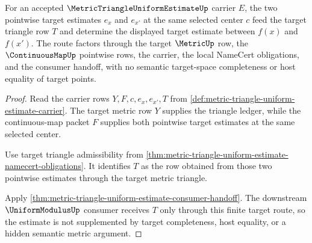 \begin{theorem}
\label{thm:metric-triangle-uniform-estimate-target-triangle-coherence}
For an accepted $\MetricTriangleUniformEstimateUp$ carrier $E$, the two pointwise target estimates $e_x$ and $e_{x'}$ at the same selected center $c$ feed the target triangle row $T$ and determine the displayed target estimate between $f(x)$ and $f(x')$. The route factors through the target $\MetricUp$ row, the $\ContinuousMapUp$ pointwise rows, the carrier, the local NameCert obligations, and the consumer handoff, with no semantic target-space completeness or host equality of target points.
\end{theorem}
\begin{proof}
Read the carrier rows $Y,F,c,e_x,e_{x'},T$ from \autoref{def:metric-triangle-uniform-estimate-carrier}. The target metric row $Y$ supplies the triangle ledger, while the continuous-map packet $F$ supplies both pointwise target estimates at the same selected center.

Use target triangle admissibility from \autoref{thm:metric-triangle-uniform-estimate-namecert-obligations}. It identifies $T$ as the row obtained from those two pointwise estimates through the target metric triangle.

Apply \autoref{thm:metric-triangle-uniform-estimate-consumer-handoff}. The downstream $\UniformModulusUp$ consumer receives $T$ only through this finite target route, so the estimate is not supplemented by target completeness, host equality, or a hidden semantic metric argument.
\end{proof}

